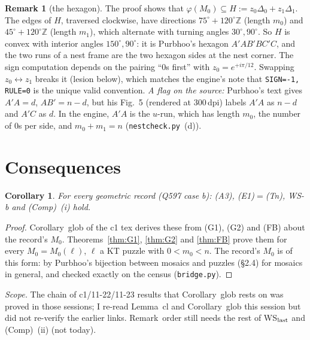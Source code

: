 \documentclass[11pt]{article}
\newtheorem{corollary}[theorem]{Corollary}
\theoremstyle{definition}\newtheorem{definition}[theorem]{Definition}\newtheorem{remark}[theorem]{Remark}
\begin{document}
\begin{remark}[the hexagon]
The proof shows that $\varphi(M_0)\subseteq H:=z_0\Delta_0+z_1\Delta_1$. The edges of $H$, traversed clockwise, have directions $75^\circ+120^\circ\mathbb Z$ (length $m_0$) and $45^\circ+120^\circ\mathbb Z$ (length $m_1$), which alternate with turning angles $30^\circ,90^\circ$. So $H$ is convex with interior angles $150^\circ,90^\circ$: it is Purbhoo's hexagon $A'AB'BC'C$, and the two runs of a nest frame are the two hexagon sides at the nest corner. The sign computation depends on the pairing ``$0$s first'' with $z_0=e^{+i\pi/12}$. Swapping $z_0\leftrightarrow z_1$ breaks it (lesion below), which matches the engine's note that \texttt{SIGN=-1, RULE=0} is the unique valid convention. \emph{A flag on the source:} Purbhoo's text gives $A'A=d$, $AB'=n-d$, but his Fig.~5 (rendered at 300\,dpi) labels $A'A$ as $n-d$ and $A'C$ as $d$. In the engine, $A'A$ is the $u$-run, which has length $m_0$, the number of 0s per side, and $m_0+m_1=n$ (\texttt{nestcheck.py}~(d)).
\end{remark}

\section{Consequences}
\begin{corollary}\label{cor:main}
For every geometric record (Q597 case b): (A3), (E1)$=$(Tn), WS-b and (Comp)~(i) hold.
\end{corollary}
\begin{proof}
Corollary~glob of the c1 tex derives these from (G1), (G2) and (FB) about the record's $M_0$. Theorems~\ref{thm:G1}, \ref{thm:G2} and \ref{thm:FB} prove them for every $M_0=M_0(\ell)$, $\ell$ a KT puzzle with $0<m_0<n$. The record's $M_0$ is of this form: by Purbhoo's bijection between mosaics and puzzles (\S2.4) for mosaics in general, and checked exactly on the census (\texttt{bridge.py}).
\end{proof}
\noindent\emph{Scope.} The chain of c1/11-22/11-23 results that Corollary~glob rests on was proved in those sessions; I re-read Lemma~cl and Corollary~glob this session but did not re-verify the earlier links. Remark~order still needs the rest of WS$_{\rm last}$ and (Comp)~(ii) (not today).
\end{document}
